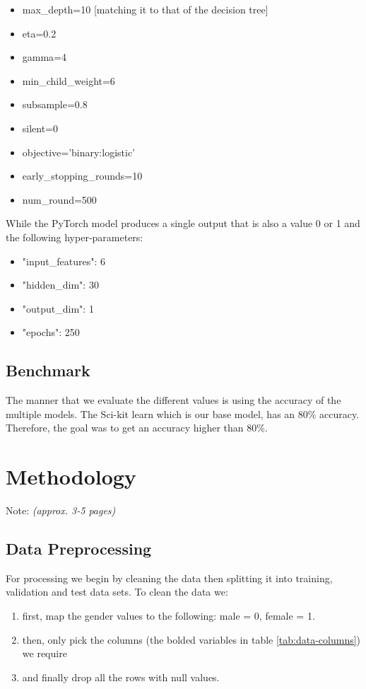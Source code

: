 \documentclass{article}
\begin{document}
\begin{itemize}
    \item 
        max\_depth=10 [matching it to that of the decision tree]
    \item 
        eta=0.2
    \item 
        gamma=4
    \item 
        min\_child\_weight=6
    \item 
        subsample=0.8
    \item 
        silent=0
    \item 
        objective='binary:logistic'
    \item 
        early\_stopping\_rounds=10
    \item 
        num\_round=500
\end{itemize}

While the PyTorch model produces a single output that is also a value 0 or 1 and the following 
hyper-parameters:

\begin{itemize}
    \item "input\_features": 6
    \item "hidden\_dim": 30
    \item "output\_dim": 1
    \item "epochs": 250
\end{itemize}

\subsection{Benchmark}\label{benchmark}

The manner that we evaluate the different values is using the accuracy of the multiple models.
The Sci-kit learn which is our base model, has an 80\% accuracy. Therefore, the goal was to get
an accuracy higher than 80\%.

\section{Methodology}\label{methodology}

Note: \emph{(approx. 3-5 pages)}

\subsection{Data Preprocessing}\label{data-preprocessing}

For processing we begin by cleaning the data then splitting it into training, validation and test data sets.
To clean the data we:
\begin{enumerate}
    \item first, map the gender values to the following: male = 0, female = 1.
    \item then, only pick the columns (the bolded variables in table \ref{tab:data-columns}) we require
    \item and finally drop all the rows with null values.
\end{enumerate}
\end{document}
